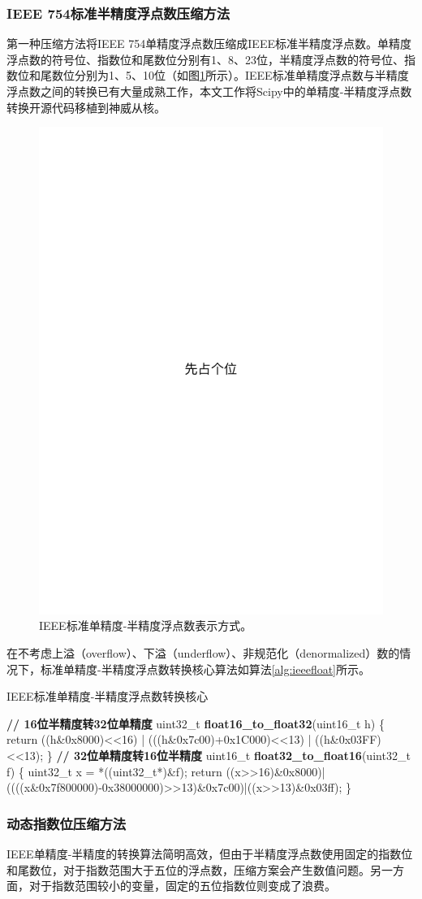 \documentclass[degree=doctor]{thuthesis}
\begin{document}
\subsubsection{IEEE 754标准半精度浮点数压缩方法}
第一种压缩方法将IEEE 754单精度浮点数压缩成IEEE标准半精度浮点数。单精度浮点数的符号位、指数位和尾数位分别有1、8、23位，半精度浮点数的符号位、指数位和尾数位分别为1、5、10位（如图\ref{fig:ieeefloathalf}所示）。IEEE标准单精度浮点数与半精度浮点数之间的转换已有大量成熟工作\cite{van2008fast}，本文工作将Scipy\cite{jones2014scipy}中的单精度-半精度浮点数转换开源代码移植到神威从核。

\begin{figure}[ht]
\centering
\includegraphics[width=0.3\columnwidth]{figures/placeholder.pdf}
\caption{IEEE标准单精度-半精度浮点数表示方式。}
\label{fig:ieeefloathalf}
\end{figure}

在不考虑上溢（overflow）、下溢（underflow）、非规范化（denormalized）数的情况下，标准单精度-半精度浮点数转换核心算法如算法\ref{alg:ieeefloat}所示。
\begin{algorithm}[ht]
\small
\caption{IEEE标准单精度-半精度浮点数转换核心}\label{alg:ieeefloat}
\begin{algorithmic}[1]
\State \textbf{// 16位半精度转32位单精度}
\State uint32\_t \textbf{float16\_to\_float32}(uint16\_t h) \{
\State \quad\quad return ((h\&0x8000)<<16) | (((h\&0x7c00)+0x1C000)<<13) | ((h\&0x03FF)<<13);
\State \}
\State
\State \textbf{// 32位单精度转16位半精度}
\State uint16\_t \textbf{float32\_to\_float16}(uint32\_t f) \{
\State \quad\quad uint32\_t x = *((uint32\_t*)\&f);
\State \quad\quad return ((x>>16)\&0x8000)|((((x\&0x7f800000)-0x38000000)>>13)\&0x7c00)|((x>>13)\&0x03ff);
\State \}
\end{algorithmic}
\end{algorithm}

\subsubsection{动态指数位压缩方法}
IEEE单精度-半精度的转换算法简明高效，但由于半精度浮点数使用固定的指数位和尾数位，对于指数范围大于五位的浮点数，压缩方案会产生数值问题。另一方面，对于指数范围较小的变量，固定的五位指数位则变成了浪费。
\end{document}

